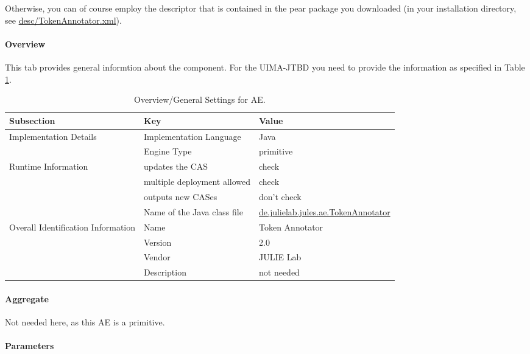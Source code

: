 \documentclass[11pt,a4paper,halfparskip]{scrartcl}
\begin{document}
Otherwise, you can of course employ the descriptor that is contained
in the pear package you downloaded (in your installation directory, see
\url{desc/TokenAnnotator.xml}).

\paragraph{Overview}
This tab provides general informtion about the component. For the
UIMA-JTBD you need to provide the information as specified in Table
\ref{tab:overview}.

\begin{table}[h!]
  \centering
  \begin{tabular}{|p{3.5cm}|p{4cm}|p{6cm}|}
    \hline
    Subsection & Key & Value \\
    \hline\hline
    Implementation Details & Implementation Language & Java \\
    \cline{2-3}
    & Engine Type & primitive \\
    \hline
    Runtime Information & updates the CAS & check \\
    \cline{2-3}
    & multiple deployment allowed & check \\
    \cline{2-3}
    & outputs new CASes &  don't check \\
    \cline{2-3}
    & Name of the Java class file & \url{de.julielab.jules.ae.TokenAnnotator}\\
    \hline
    Overall Identification Information & Name &  Token Annotator \\
    \cline{2-3}
    & Version &  2.0 \\
    \cline{2-3}
    & Vendor & JULIE Lab\\
    \cline{2-3}
    & Description & not needed\\
    \hline
  \end{tabular}
  \caption{Overview/General Settings for AE.}
  \label{tab:overview}
\end{table}


\paragraph{Aggregate}
Not needed here, as this AE is a primitive.

\paragraph{Parameters}
\label{sss:parameters}
\end{document}
